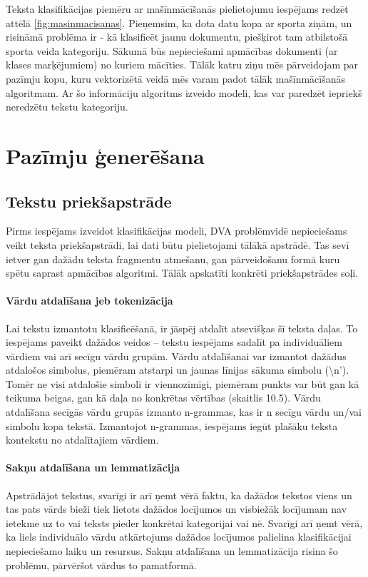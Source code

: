 Teksta klasifikācijas piemēru ar mašīnmācīšanās pielietojumu iespējams redzēt attēlā  \ref{fig:masinmacisanas}. Pieņemsim, ka dota datu kopa ar sporta ziņām, un risināmā problēma ir - kā klasificēt jaunu dokumentu, piešķirot tam atbilstošā sporta veida kategoriju. Sākumā būs nepieciešami apmācības dokumenti (ar klases marķējumiem) no kuriem mācīties. Tālāk katru ziņu mēs pārveidojam par pazīmju kopu, kuru vektorizētā veidā mēs varam padot tālāk mašīnmācīšanās algoritmam. Ar šo informāciju algoritms izveido modeli, kas var paredzēt iepriekš neredzētu tekstu kategoriju.

\chapter{Pazīmju ģenerēšana}
\section{Tekstu priekšapstrāde}
Pirms iespējams izveidot klasifikācijas modeli, DVA problēmvidē nepieciešams veikt teksta priekšapstrādi, lai dati būtu pielietojami tālākā apstrādē. Tas sevī ietver gan dažādu teksta fragmentu atmešanu, gan pārveidošanu formā kuru spētu saprast apmācības algoritmi. Tālāk apskatīti konkrēti priekšapstrādes soļi.

\subsubsection{Vārdu atdalīšana jeb tokenizācija}
Lai tekstu izmantotu klasificēšanā, ir jāspēj atdalīt atsevišķas šī teksta daļas. To iespējams paveikt dažādos veidos – tekstu iespējams sadalīt pa individuāliem vārdiem vai arī  secīgu vārdu grupām. Vārdu atdalīšanai var izmantot dažādus atdalošos simbolus, piemēram atstarpi un jaunas līnijas sākuma simbolu (\textbackslash n’). Tomēr ne visi atdalošie simboli ir viennozīmīgi, piemēram punkts var būt gan kā teikuma beigas, gan kā daļa no konkrētas vērtības (skaitlis 10.5).
Vārdu atdalīšana secīgās vārdu grupās izmanto n-grammas, kas ir n secīgu vārdu un/vai simbolu kopa tekstā. Izmantojot n-grammas, iespējams iegūt plašāku teksta kontekstu no atdalītajiem vārdiem.

\subsubsection{Sakņu atdalīšana un lemmatizācija}
Apstrādājot tekstus, svarīgi ir arī ņemt vērā faktu, ka dažādos tekstos viens un tas pats vārds bieži tiek lietots dažādos locījumos un visbiežāk locījumam nav ietekme uz to vai teksts pieder konkrētai kategorijai vai nē. Svarīgi arī ņemt vērā, ka liels individuālo vārdu atkārtojums dažādos locījumos palielina klasifikācijai nepieciešamo laiku un resursus. Sakņu atdalīšana un lemmatizācija risina šo problēmu, pārvēršot vārdus to pamatformā. 

